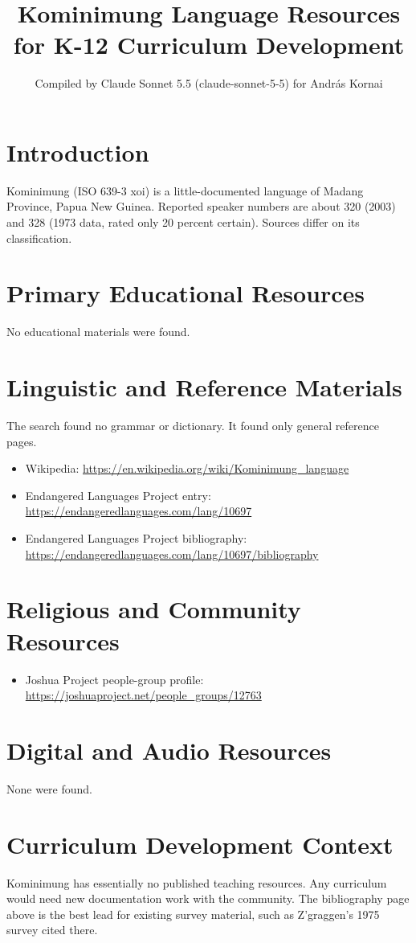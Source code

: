 \documentclass[12pt]{article}
\title{Kominimung Language Resources for K-12 Curriculum Development}
\author{Compiled by Claude Sonnet 5.5 (claude-sonnet-5-5) for Andr\'as Kornai}
\date{}
\begin{document}
\maketitle

\section{Introduction}
Kominimung (ISO 639-3 xoi) is a little-documented language of Madang Province, Papua New Guinea. Reported speaker numbers are about 320 (2003) and 328 (1973 data, rated only 20 percent certain). Sources differ on its classification.

\section{Primary Educational Resources}
No educational materials were found.

\section{Linguistic and Reference Materials}
The search found no grammar or dictionary. It found only general reference pages.
\begin{itemize}
\item Wikipedia: \url{https://en.wikipedia.org/wiki/Kominimung_language}
\item Endangered Languages Project entry: \url{https://endangeredlanguages.com/lang/10697}
\item Endangered Languages Project bibliography: \url{https://endangeredlanguages.com/lang/10697/bibliography}
\end{itemize}

\section{Religious and Community Resources}
\begin{itemize}
\item Joshua Project people-group profile: \url{https://joshuaproject.net/people_groups/12763}
\end{itemize}

\section{Digital and Audio Resources}
None were found.

\section{Curriculum Development Context}
Kominimung has essentially no published teaching resources. Any curriculum would need new documentation work with the community. The bibliography page above is the best lead for existing survey material, such as Z'graggen's 1975 survey cited there.
\end{document}
